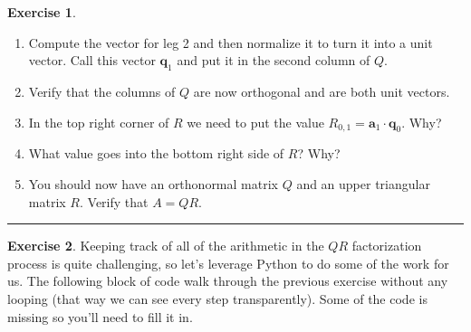 \documentclass[
]{book}
\theoremstyle{definition}
\theoremstyle{definition}
\theoremstyle{definition}
\newtheorem{exercise}{Exercise}[chapter]
\theoremstyle{remark}
\begin{document}
\begin{exercise}
\begin{enumerate}
  \[ \text{hypotenuse } = \boldsymbol{a}_1 \]
  \[ \text{leg 1 } = \left( \frac{\boldsymbol{a}_1 \cdot \boldsymbol{q}_0}{\boldsymbol{q}_0 \cdot \boldsymbol{q}_0} \right) \boldsymbol{q}_0 = \underline{\hspace{1in}} \]
  \[ \text{leg 2 } = \underline{\hspace{1in}} - \underline{\hspace{1in}}. \]
\item
  Compute the vector for leg 2 and then normalize it to turn it into a unit vector. Call this vector \(\boldsymbol{q}_1\) and put it in the second column of \(Q\).\\
\item
  Verify that the columns of \(Q\) are now orthogonal and are both unit vectors.
\item
  In the top right corner of \(R\) we need to put the value \(R_{0,1} = \boldsymbol{a}_1 \cdot \boldsymbol{q}_0\). Why?
\item
  What value goes into the bottom right side of \(R\)? Why?
\item
  You should now have an orthonormal matrix \(Q\) and an upper triangular matrix \(R\). Verify that \(A = QR\).
\end{enumerate}
\end{exercise}

\begin{center}\rule{0.5\linewidth}{0.5pt}\end{center}

\begin{exercise}
\protect\hypertarget{exr:unnamed-chunk-342}{}{\label{exr:unnamed-chunk-342} }Keeping track of all of the arithmetic in the \(QR\) factorization process is quite challenging, so let's leverage Python to do some of the work for us. The following block of code walk through the previous exercise without any looping (that way we can see every step transparently). Some of the code is missing so you'll need to fill it in.
\end{exercise}
\end{document}
